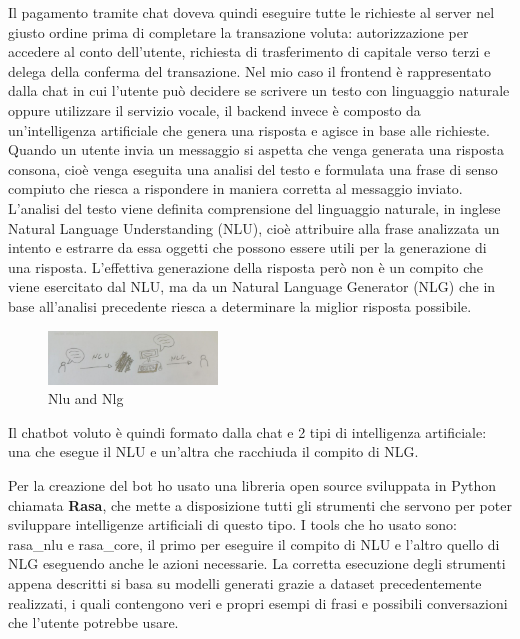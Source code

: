 Il pagamento tramite chat doveva quindi eseguire tutte le richieste al server nel giusto ordine prima di completare la transazione voluta: autorizzazione per accedere al conto dell'utente, richiesta di trasferimento di capitale verso terzi e delega della conferma del transazione.
Nel mio caso il frontend è rappresentato dalla chat in cui l'utente può decidere se scrivere un testo con linguaggio naturale oppure utilizzare il servizio vocale, il backend invece è composto da un'intelligenza artificiale che genera una risposta e agisce in base alle richieste.
Quando un utente invia un messaggio si aspetta che venga generata una risposta consona, cioè venga eseguita una analisi del testo e formulata una frase di senso compiuto che riesca a rispondere in maniera corretta al messaggio inviato.
L'analisi del testo viene definita comprensione del linguaggio naturale, in inglese Natural Language Understanding (NLU), cioè attribuire alla frase analizzata un intento e estrarre da essa oggetti che possono essere utili per la generazione di una risposta.
L'effettiva generazione della risposta però non è un compito che viene esercitato dal NLU, ma da un Natural Language Generator (NLG) che in base all'analisi precedente riesca a determinare la miglior risposta possibile.
\begin{figure}[H]
 \centering
    \includegraphics[width=0.4\textwidth]{img/nlu_nlg.jpg}
 \caption{Nlu and Nlg}
\end{figure}
Il chatbot voluto è quindi formato dalla chat e 2 tipi di intelligenza artificiale: una che esegue il NLU e un'altra che racchiuda il compito di NLG.

Per la creazione del bot ho usato una libreria open source sviluppata in Python chiamata \textbf{Rasa}, che mette a disposizione tutti gli strumenti che servono per poter sviluppare intelligenze artificiali di questo tipo. I tools che ho usato sono: rasa\_nlu e rasa\_core, il primo per eseguire il compito di NLU e l'altro quello di NLG eseguendo anche le azioni necessarie.
La corretta esecuzione degli strumenti appena descritti si basa su modelli generati grazie a dataset precedentemente realizzati, i quali contengono veri e propri esempi di frasi e possibili conversazioni che l'utente potrebbe usare.
